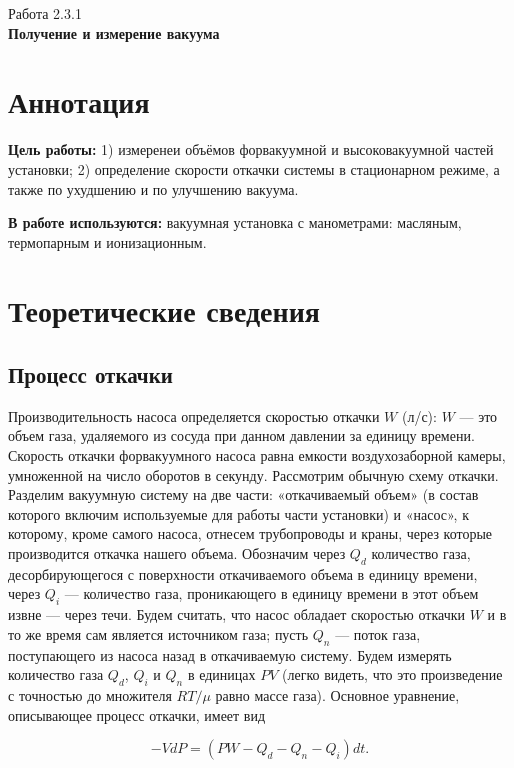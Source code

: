 \documentclass[a4paper,12pt]{article} %
\begin{document}
\begin{center}   
	\large{Работа 2.3.1\\\textbf{Получение и измерение вакуума}}\\
\end{center}

\section{Аннотация}

\noindent\textbf{Цель работы:}
1) измеренеи объёмов форвакуумной и высоковакуумной частей установки; 2) определение скорости откачки системы в стационарном режиме, а также по ухудшению и по улучшению вакуума.
	
\smallskip
\noindent\textbf{В работе используются:}
вакуумная установка с манометрами: масляным, термопарным и ионизационным.

\section{Теоретические сведения}

\subsection*{Процесс откачки}

Производительность насоса определяется скоростью откачки $W$ (л/с): $W$ — это объем газа, удаляемого из сосуда при данном давлении за единицу времени. Скорость откачки форвакуумного насоса равна емкости воздухозаборной камеры, умноженной на число оборотов в секунду.
Рассмотрим обычную схему откачки. Разделим вакуумную систему на две части: «откачиваемый объем» (в состав которого включим используемые для работы части установки) и «насос», к которому, кроме самого насоса, отнесем трубопроводы и краны, через которые
производится откачка нашего объема. Обозначим через $Q_d$ количество газа, десорбирующегося с поверхности откачиваемого объема в единицу времени, через $Q_i$ — количество газа, проникающего в единицу времени в этот объем извне — через течи. Будем считать, что насос обладает скоростью откачки $W$ и в то же время сам является источником газа; пусть $Q_n$ — поток газа, поступающего из насоса назад в откачиваемую систему. Будем измерять количество газа $Q_d$, $Q_i$ и $Q_n$ в единицах $PV$ (легко видеть, что это произведение с точностью до множителя $RT/ \mu$ равно массе газа). Основное уравнение, описывающее процесс откачки, имеет вид

\begin{equation}
\label{otkachka}
	-VdP=(PW-Q_d-Q_n-Q_i)dt.
\end{equation}
\end{document}

